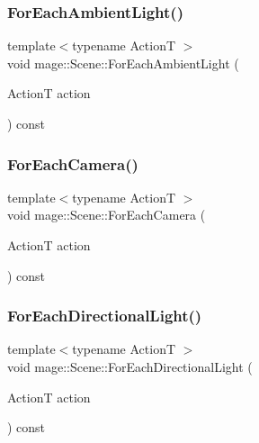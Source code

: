 \hypertarget{classmage_1_1_scene_acf4c97b1de3c66afa22236e5da8b221a}{}\label{classmage_1_1_scene_acf4c97b1de3c66afa22236e5da8b221a} 
\subsubsection{\texorpdfstring{For\+Each\+Ambient\+Light()}{ForEachAmbientLight()}}
{\footnotesize\ttfamily template$<$typename ActionT $>$ \\
void mage\+::\+Scene\+::\+For\+Each\+Ambient\+Light (\begin{DoxyParamCaption}\item[{ActionT}]{action }\end{DoxyParamCaption}) const}

\hypertarget{classmage_1_1_scene_ad8bf21d83004da3d0fa3ecee120be13b}{}\label{classmage_1_1_scene_ad8bf21d83004da3d0fa3ecee120be13b} 
\subsubsection{\texorpdfstring{For\+Each\+Camera()}{ForEachCamera()}}
{\footnotesize\ttfamily template$<$typename ActionT $>$ \\
void mage\+::\+Scene\+::\+For\+Each\+Camera (\begin{DoxyParamCaption}\item[{ActionT}]{action }\end{DoxyParamCaption}) const}

\hypertarget{classmage_1_1_scene_ad9e888d8851594b9565300e09de3ed7a}{}\label{classmage_1_1_scene_ad9e888d8851594b9565300e09de3ed7a} 
\subsubsection{\texorpdfstring{For\+Each\+Directional\+Light()}{ForEachDirectionalLight()}}
{\footnotesize\ttfamily template$<$typename ActionT $>$ \\
void mage\+::\+Scene\+::\+For\+Each\+Directional\+Light (\begin{DoxyParamCaption}\item[{ActionT}]{action }\end{DoxyParamCaption}) const}

